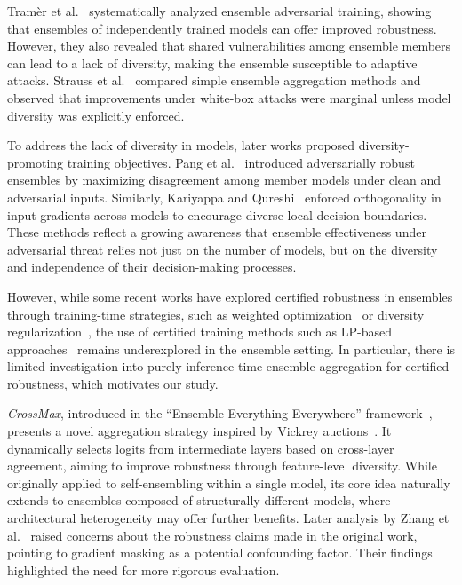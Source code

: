 Tramèr et al.~\cite{tramer2017ensemble} systematically analyzed ensemble adversarial training, showing that ensembles of independently trained models can offer improved robustness. However, they also revealed that shared vulnerabilities among ensemble members can lead to a lack of diversity, making the ensemble susceptible to adaptive attacks. Strauss et al.~\cite{strauss2017ensemble} compared simple ensemble aggregation methods and observed that improvements under white-box attacks were marginal unless model diversity was explicitly enforced.

To address the lack of diversity in models, later works proposed diversity-promoting training objectives. Pang et al.~\cite{pang2019improving} introduced adversarially robust ensembles by maximizing disagreement among member models under clean and adversarial inputs. Similarly, Kariyappa and Qureshi~\cite{kariyappa2019improving} enforced orthogonality in input gradients across models to encourage diverse local decision boundaries. These methods reflect a growing awareness that ensemble effectiveness under adversarial threat relies not just on the number of models, but on the diversity and independence of their decision-making processes.

However, while some recent works have explored certified robustness in ensembles through training-time strategies, such as weighted optimization~\cite{zhang2019enhancing} or diversity regularization~\cite{yang2021certified}, the use of certified training methods such as LP-based approaches~\cite{wong2018provable} remains underexplored in the ensemble setting. In particular, there is limited investigation into purely inference-time ensemble aggregation for certified robustness, which motivates our study.

\textit{CrossMax}, introduced in the ``Ensemble Everything Everywhere'' framework~\cite{fort2024ensemble}, presents a novel aggregation strategy inspired by Vickrey auctions~\cite{vickrey1961counterspeculation}. It dynamically selects logits from intermediate layers based on cross-layer agreement, aiming to improve robustness through feature-level diversity. While originally applied to self-ensembling within a single model, its core idea naturally extends to ensembles composed of structurally different models, where architectural heterogeneity may offer further benefits. Later analysis by Zhang et al.~\cite{zhang2024evaluating} raised concerns about the robustness claims made in the original work, pointing to gradient masking as a potential confounding factor. Their findings highlighted the need for more rigorous evaluation.

